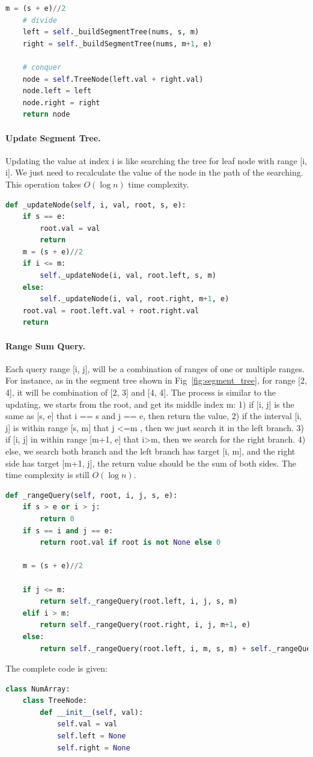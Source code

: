 \documentclass[data-structure.tex]{subfiles}
\begin{document}
\begin{examples}[resume]
\begin{lstlisting}[language=Python]
    m = (s + e)//2
    # divide 
    left = self._buildSegmentTree(nums, s, m)
    right = self._buildSegmentTree(nums, m+1, e)
    
    # conquer
    node = self.TreeNode(left.val + right.val)
    node.left = left
    node.right = right
    return node
\end{lstlisting}
\paragraph{Update Segment Tree.} Updating the value at index i is like searching the tree for leaf node with range [i, i]. We just need to recalculate the value of the node in the path of the searching. This operation takes $O(\log n)$ time complexity. 
\begin{lstlisting}[language=Python]
def _updateNode(self, i, val, root, s, e):
    if s == e:
        root.val = val
        return 
    m = (s + e)//2
    if i <= m:
        self._updateNode(i, val, root.left, s, m)
    else:
        self._updateNode(i, val, root.right, m+1, e)
    root.val = root.left.val + root.right.val
    return
\end{lstlisting}
\paragraph{Range Sum Query.} Each query range [i, j], will be a combination of ranges of one or multiple ranges. For instance, as in the segment tree  shown in Fig~\ref{fig:segment_tree}, for range [2, 4], it will be combination of [2, 3] and [4, 4]. The process is similar to the updating, we starts from the root, and get its middle index m: 1) if [i, j] is the same as [s, e] that i == s and j == e, then return the value, 2) if the interval [i, j] is within range [s, m] that j <=m , then we just search it in the left branch. 3) if [i, j] in within range [m+1, e] that i>m, then we search for the right branch. 4) else, we search both branch and the left branch has target [i, m], and the right side has target [m+1, j], the return value should be the sum of both sides.  The time complexity is still $O(\log n)$. 
\begin{lstlisting}[language=Python]
def _rangeQuery(self, root, i, j, s, e): 
    if s > e or i > j:
        return 0
    if s == i and j == e:
        return root.val if root is not None else 0
    
    m = (s + e)//2

    if j <= m:
        return self._rangeQuery(root.left, i, j, s, m)
    elif i > m:
        return self._rangeQuery(root.right, i, j, m+1, e)
    else:
        return self._rangeQuery(root.left, i, m, s, m) + self._rangeQuery(root.right, m+1, j, m+1, e)
\end{lstlisting}
The complete code is given: 
\begin{lstlisting}[language=Python]
class NumArray:
    class TreeNode:
        def __init__(self, val):
            self.val = val
            self.left = None
            self.right = None


\end{lstlisting}
\end{examples}
\end{document}
